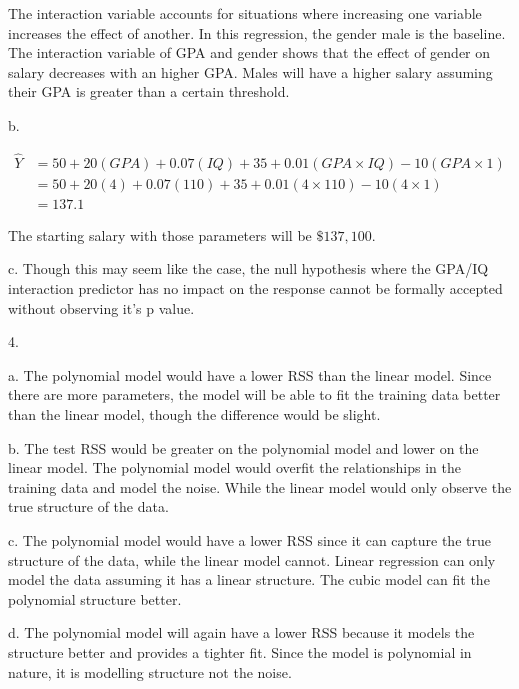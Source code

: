 \documentclass[
]{article}
\begin{document}
The interaction variable accounts for situations where increasing one
variable increases the effect of another. In this regression, the gender
male is the baseline. The interaction variable of GPA and gender shows
that the effect of gender on salary decreases with an higher GPA. Males
will have a higher salary assuming their GPA is greater than a certain
threshold.

b.

\begin{align}
\hat{Y} &= 50 + 20(GPA) + 0.07(IQ) + 35 + 0.01(GPA\times IQ) - 10(GPA\times 1) \\
&= 50 + 20(4) + 0.07(110) + 35 + 0.01(4\times 110) - 10(4\times 1) \\
&= 137.1
\end{align}

The starting salary with those parameters will be \(\$137, 100\).

c. Though this may seem like the case, the null hypothesis where the
GPA/IQ interaction predictor has no impact on the response cannot be
formally accepted without observing it's p value.

4.

a. The polynomial model would have a lower RSS than the linear model.
Since there are more parameters, the model will be able to fit the
training data better than the linear model, though the difference would
be slight.

b. The test RSS would be greater on the polynomial model and lower on
the linear model. The polynomial model would overfit the relationships
in the training data and model the noise. While the linear model would
only observe the true structure of the data.

c. The polynomial model would have a lower RSS since it can capture the
true structure of the data, while the linear model cannot. Linear
regression can only model the data assuming it has a linear structure.
The cubic model can fit the polynomial structure better.

d. The polynomial model will again have a lower RSS because it models
the structure better and provides a tighter fit. Since the model is
polynomial in nature, it is modelling structure not the noise.
\end{document}
